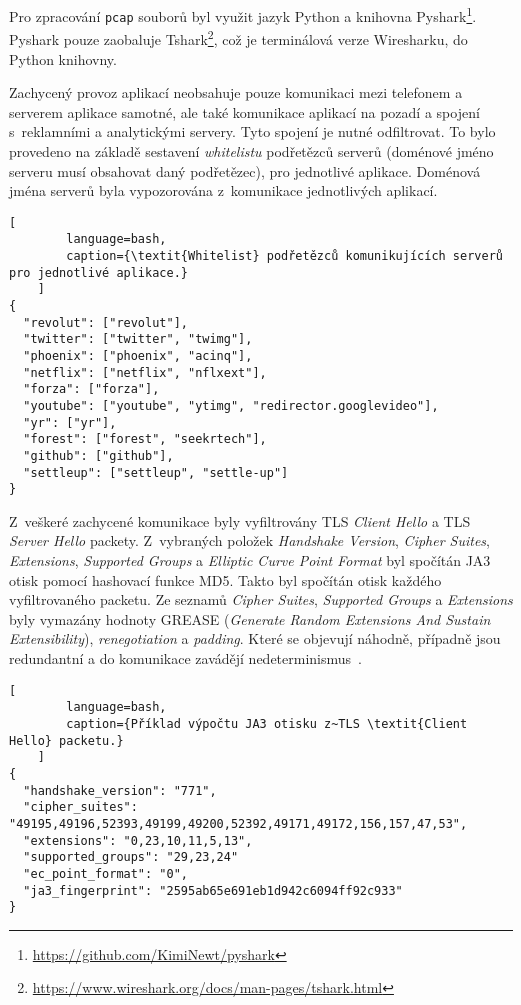 Pro zpracování \texttt{pcap} souborů byl využit jazyk Python a knihovna Pyshark\footnote{\url{https://github.com/KimiNewt/pyshark}}. Pyshark pouze zaobaluje Tshark\footnote{\url{https://www.wireshark.org/docs/man-pages/tshark.html}}, což je terminálová verze Wiresharku, do Python knihovny.

Zachycený provoz aplikací neobsahuje pouze komunikaci mezi telefonem a serverem aplikace samotné, ale také komunikace aplikací na pozadí a spojení s~reklamními a analytickými servery. Tyto spojení je nutné odfiltrovat. To bylo provedeno na základě sestavení \textit{whitelistu} podřetězců serverů (doménové jméno serveru musí obsahovat daný podřetězec), pro jednotlivé aplikace. Doménová jména serverů byla vypozorována z~komunikace jednotlivých aplikací.

\begin{center}
    \begin{lstlisting}[
        language=bash,
        caption={\textit{Whitelist} podřetězců komunikujících serverů pro jednotlivé aplikace.}
    ]
{
  "revolut": ["revolut"],
  "twitter": ["twitter", "twimg"],
  "phoenix": ["phoenix", "acinq"],
  "netflix": ["netflix", "nflxext"],
  "forza": ["forza"],
  "youtube": ["youtube", "ytimg", "redirector.googlevideo"],
  "yr": ["yr"],
  "forest": ["forest", "seekrtech"],
  "github": ["github"],
  "settleup": ["settleup", "settle-up"]
}
\end{lstlisting}
\end{center}

Z~veškeré zachycené komunikace byly vyfiltrovány TLS \textit{Client Hello} a TLS \textit{Server Hello} packety. Z~vybraných položek \textit{Handshake Version}, \textit{Cipher Suites}, \textit{Extensions}, \textit{Supported Groups} a \textit{Elliptic Curve Point Format} byl spočítán JA3 otisk pomocí hashovací funkce MD5. Takto byl spočítán otisk každého vyfiltrovaného packetu. Ze seznamů \textit{Cipher Suites}, \textit{Supported Groups} a \textit{Extensions} byly vymazány hodnoty GREASE (\textit{Generate Random Extensions And Sustain Extensibility}), \textit{renegotiation} a \textit{padding}. Které se objevují náhodně, případně jsou redundantní a do komunikace zavádějí nedeterminismus~\cite{bib_matousek}.

\begin{center}
    \begin{lstlisting}[
        language=bash,
        caption={Příklad výpočtu JA3 otisku z~TLS \textit{Client Hello} packetu.}
    ]
{
  "handshake_version": "771",
  "cipher_suites": "49195,49196,52393,49199,49200,52392,49171,49172,156,157,47,53",
  "extensions": "0,23,10,11,5,13",
  "supported_groups": "29,23,24"
  "ec_point_format": "0",
  "ja3_fingerprint": "2595ab65e691eb1d942c6094ff92c933"
}
\end{lstlisting}
\end{center}

